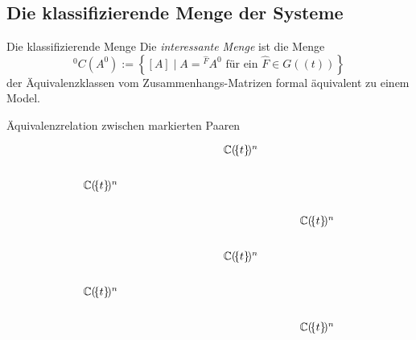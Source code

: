 \subsection{Die klassifizierende Menge der Systeme}
\begin{frame}{Die klassifizierende Menge}
  Die \textit{interessante Menge} ist die Menge
  \[
    {}^0\!C(A^0):=\left\{\left[A\right]
      \mid A={}^{\hat F}\!A^0 \text{ für ein } \hat F\in G(\!(t)\!)\right\}
  \]
  der Äquivalenzklassen vom Zusammenhangs-Matrizen formal äquivalent zu
  einem Model.

\end{frame}
\begin{frame}[fragile]{Äquivalenzrelation zwischen markierten Paaren}
  \[ \begin{tikzcd}[column sep=1cm,row sep=.5cm]
      &&&\C(\!\{t\}\!)^n
      \\\C(\!\{t\}\!)^n
      \\&&&&\C(\!\{t\}\!)^n
      \\&&&\C(\!\{t\}\!)^n
      \\\C(\!\{t\}\!)^n
      \\&&&&\C(\!\{t\}\!)^n
    \end{tikzcd} \]
\end{frame}

